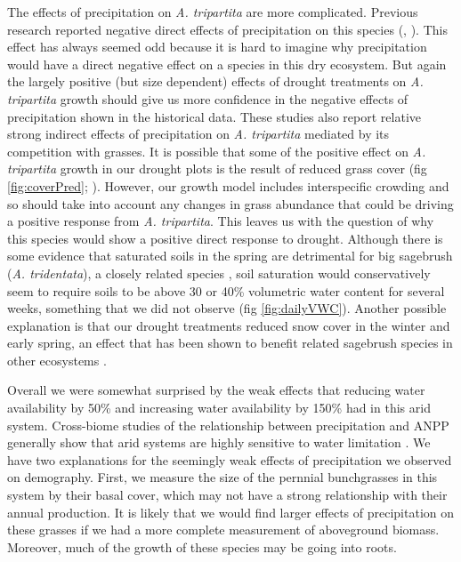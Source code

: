 \documentclass[11pt]{article}
\begin{document}
\begin{doublespace}
The effects of precipitation on \textit{A. tripartita} are more complicated. Previous research reported negative direct effects of precipitation on this species (\citep{adler_forecasting_2012}, \citep{chu_direct_2016}). This effect has always seemed odd because it is hard to imagine why precipitation would have a direct negative effect on a species in this dry ecosystem. But again the largely positive (but size dependent) effects of drought treatments on \textit{A. tripartita} growth should give us more confidence in the negative effects of precipitation shown in the historical data. These studies also report relative strong indirect effects of precipitation on \textit{A. tripartita} mediated by its competition with grasses. It is possible that some of the positive effect on \textit{A. tripartita} growth in our drought plots is the result of reduced grass cover (fig \ref{fig:coverPred}; \citep{chu_direct_2016}). However, our growth model includes interspecific crowding and so should take into account any changes in grass abundance that could be driving a positive response from \textit{A. tripartita}. This leaves us with the question of why this species would show a positive direct response to drought. Although there is some evidence that saturated soils in the spring are detrimental for big sagebrush (\textit{A. tridentata}), a closely related species \citep{sturges_response_1989,germino_desert_2014}, soil saturation would conservatively seem to require soils to be above 30 or 40\% volumetric water content for several weeks, something that we did not observe (fig \ref{fig:dailyVWC}). Another possible explanation is that our drought treatments reduced snow cover in the winter and early spring, an effect that has been shown to benefit related sagebrush species in other ecosystems \citep{perfors_enhanced_2003}. 

Overall we were somewhat surprised by the weak effects that reducing water availability by 50\% and increasing water availability by 150\% had in this arid system. Cross-biome studies of the relationship between precipitation and ANPP generally show that arid systems are highly sensitive to water limitation \citep{huxman_convergence_2004}. We have two explanations for the seemingly weak effects of precipitation we observed on demography. First, we measure the size of the pernnial bunchgrasses in this system by their basal cover, which may not have a strong relationship with their annual production. It is likely that we would find larger effects of precipitation on these grasses if we had a more complete measurement of aboveground biomass. Moreover, much of the growth of these species may be going into roots. 


\end{doublespace}
\end{document}
